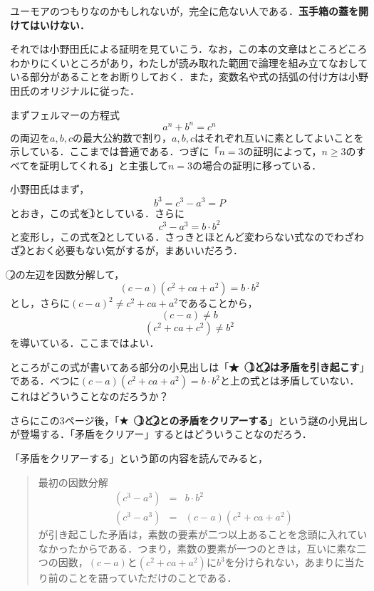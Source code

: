 ユーモアのつもりなのかもしれないが，完全に危ない人である．\textbf{玉手箱の蓋を開けてはいけない．}

それでは小野田氏による証明を見ていこう．なお，この本の文章はところどころわかりにくいところがあり，わたしが読み取れた範囲で論理を組み立てなおしている部分があることをお断りしておく．また，変数名や式の括弧の付け方は小野田氏のオリジナルに従った．

まずフェルマーの方程式
\[a^n+b^n=c^n\]
の両辺を$a,b,c$の最大公約数で割り，$a,b,c$はそれぞれ互いに素としてよいことを示している．ここまでは普通である．つぎに「$n=3$の証明によって，$n\geq 3$のすべてを証明してくれる」と主張して$n=3$の場合の証明に移っている．



小野田氏はまず，
\[b^3=c^3-a^3=P\]
とおき，この式を\textcircled{\scriptsize 1}としている．さらに
\[c^3-a^3=b\cdot b^2\]
と変形し，この式を\textcircled{\scriptsize 2}としている．さっきとほとんど変わらない式なのでわざわざ\textcircled{\scriptsize 2}とおく必要もない気がするが，まあいいだろう．

\textcircled{\scriptsize 2}の左辺を因数分解して，
\[(c-a)(c^2+ca+a^2)=b\cdot b^2\]
とし，さらに$(c-a)^2 \neq c^2+ca+a^2$であることから，
\[(c-a)\neq b\]
\[(c^2+ca+c^2)\neq b^2\]
を導いている．ここまではよい．

ところがこの式が書いてある部分の小見出しは「\textbf{★　\textcircled{\scriptsize 1}と\textcircled{\scriptsize 2}は矛盾を引き起こす}」である．べつに$(c-a)(c^2+ca+a^2)=b\cdot b^2$と上の式とは矛盾していない．これはどういうことなのだろうか？

さらにこの3ページ後，「\textbf{★　\textcircled{\scriptsize 1}と\textcircled{\scriptsize 2}との矛盾をクリアーする}」という謎の小見出しが登場する．「矛盾をクリアー」するとはどういうことなのだろう．

「矛盾をクリアーする」という節の内容を読んでみると，

\begin{quote}
最初の因数分解
\begin{eqnarray*}
(c^3-a^3)&=&b\cdot b^2\\
(c^3-a^3)&=&(c-a)(c^2+ca+a^2)
\end{eqnarray*}
が引き起こした矛盾は，素数の要素が二つ以上あることを念頭に入れていなかったからである．つまり，素数の要素が一つのときは，互いに素な二つの因数，$(c-a)$と$(c^2+ca+a^2)$に$b^3$を分けられない，あまりに当たり前のことを語っていただけのことである．
\end{quote}

